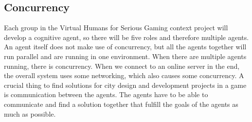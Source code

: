\newpage
\subsection{Concurrency}
Each group in the Virtual Humans for Serious Gaming context project will develop a cognitive agent, so there will be five roles and therefore multiple agents. An agent itself does not make use of concurrency, but all the agents together will run parallel and are running in one environment. When there are multiple agents running, there is concurrency. When we connect to an online server in the end, the overall system uses some networking, which also causes some concurrency. A crucial thing to find solutions for city design and development projects in a game is communication between the agents. The agents have to be able to communicate and find a solution together that fulfill the goals of the agents as much as possible.




